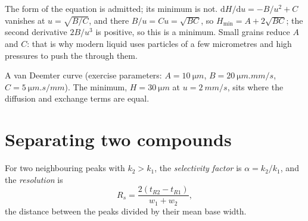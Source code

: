 \admitted

The form of the equation is admitted; its minimum is not. $\mathrm dH/\mathrm du = -B/u^2 + C$ vanishes
at $u = \sqrt{B/C}$, and there $B/u = Cu = \sqrt{BC}$, so $H_{\min} = A + 2\sqrt{BC}$; the second
derivative $2B/u^3$ is positive, so this is a minimum. Small grains reduce $A$ and $C$: that is why
modern liquid  uses particles of a few micrometres and high pressures to push the  through them.

\begin{omfigure}

{\small A van Deemter curve (exercise parameters: $A = \qty{10}{\micro m}$, $B = \qty{20}{\micro m.mm/s}$,
$C = \qty{5}{\micro m.s/mm}$). The minimum, $H = \qty{30}{\micro m}$ at $u = \qty{2}{mm/s}$, sits where
the diffusion and exchange terms are equal.}
\end{omfigure}

\section{Separating two compounds}

\begin{definition}\label{def:b2:chromatography:separation}
For two neighbouring peaks with $k_2 > k_1$, the \emph{selectivity factor} is
$\alpha = k_2/k_1$, and the \emph{resolution} is
\begin{equation*}
R_s = \frac{2(t_{R2} - t_{R1})}{w_1 + w_2},
\end{equation*}
the distance between the peaks divided by their mean base width.
\end{definition}


